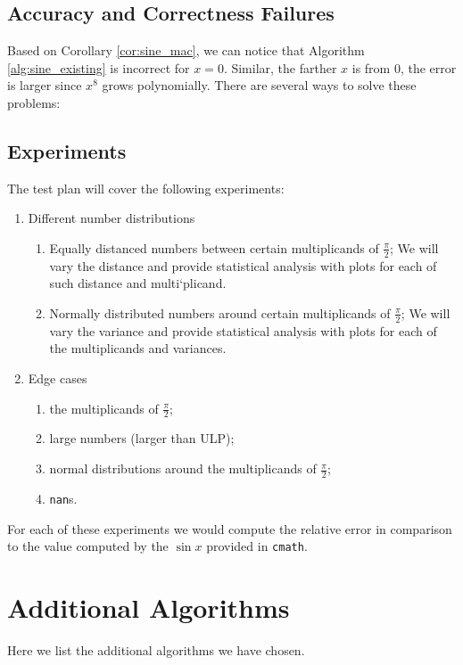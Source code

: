 \documentclass[12pt]{article}
\begin{document}
\subsection{Accuracy and Correctness Failures} \label{subsec:acc_and_corr}
Based on Corollary \ref{cor:sine_mac}, we can notice that Algorithm \ref{alg:sine_existing} is incorrect for $x = 0$.
Similar, the farther $x$ is from 0, the error is larger since $x^8$ grows polynomially.
There are several ways to solve these problems:

\subsection{Experiments}


The test plan will cover the following experiments:
\begin{enumerate}
    \item Different number distributions
    \begin{enumerate}
        \item Equally distanced numbers between certain multiplicands of $\frac{\pi}{2}$; We will vary the distance and provide statistical analysis with plots for each of such distance and multi`plicand.
        \item Normally distributed numbers around certain multiplicands of $\frac{\pi}{2}$; We will vary the variance and provide statistical analysis with plots for each of the multiplicands and variances.
    \end{enumerate}
    \item Edge cases
        \begin{enumerate}
            \item the multiplicands of $\frac{\pi}{2}$;
            \item large numbers (larger than ULP);
            \item normal distributions around the multiplicands of $\frac{\pi}{2}$;
            \item \texttt{nan}s.
        \end{enumerate}
\end{enumerate}
For each of these experiments we would compute the relative error in comparison to the value computed by the $\sin x$ provided in \texttt{cmath}.
\newpage
\section{Additional Algorithms}
Here we list the additional algorithms we have chosen.
\end{document}
